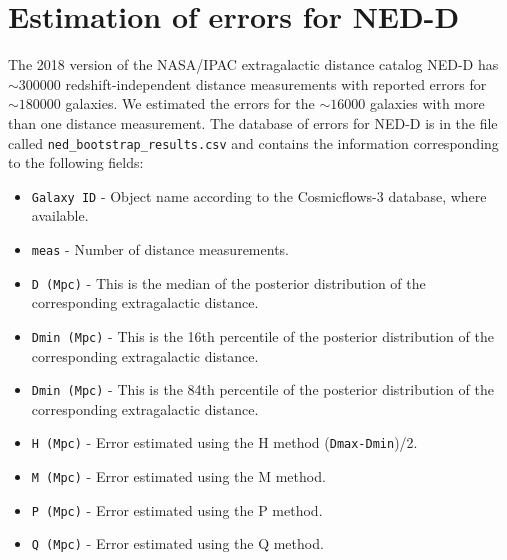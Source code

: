 \documentclass[a4paper,fleqn,usenatbib]{mnras}
\begin{document}
\section{Estimation of errors for NED-D}
The 2018 version of the NASA/IPAC extragalactic distance catalog NED-D has $\sim300000$ redshift-independent distance measurements with reported errors for $\sim180000$ galaxies. We estimated the errors for the $\sim16000$ galaxies with more than one distance measurement. The database of errors for NED-D is in the file called \texttt{ned\_bootstrap\_results.csv} and contains the information corresponding to the following fields:
\begin{itemize}
\item \texttt{Galaxy ID} - Object name according to the Cosmicflows-3 database, where available.
\item \texttt{meas} - Number of distance measurements.
\item \texttt{D (Mpc)} - This is the median of the posterior distribution of the corresponding extragalactic distance.
\item \texttt{Dmin (Mpc)} - This is the 16th percentile of the posterior distribution of the corresponding extragalactic distance.
\item \texttt{Dmin (Mpc)} - This is the 84th percentile of the posterior distribution of the corresponding extragalactic distance.
\item \texttt{H (Mpc)} - Error estimated using the H method (\texttt{Dmax-Dmin})/2.
\item \texttt{M (Mpc)} - Error estimated using the M method. 
\item \texttt{P (Mpc)} - Error estimated using the P method. 
\item \texttt{Q (Mpc)} - Error estimated using the Q method. 
\end{itemize}








\bsp	%
\label{lastpage}
\end{document}
